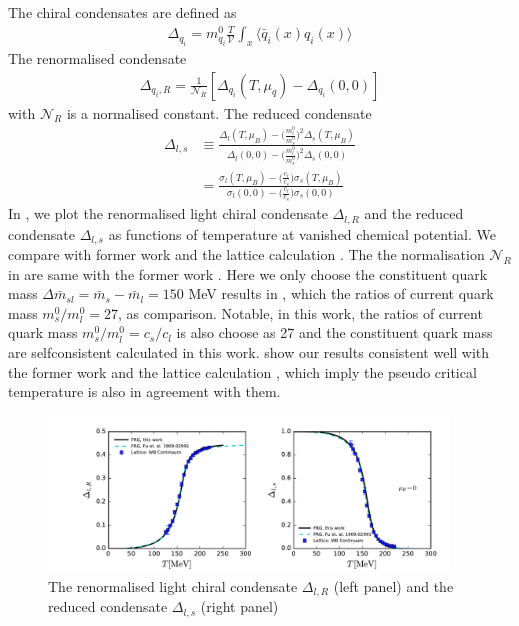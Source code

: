 \documentclass[%
reprint,
superscriptaddress,
showpacs,preprintnumbers,
amsmath,amssymb,
aps,
prd,
]{revtex4-1}
\def\fig#1{\Cref{#1}}
\def\Eq#1{\Cref{#1}}
\begin{document}
The chiral condensates are defined as
\begin{align}
\Delta_{q_i}=m_{q_i}^0\frac{T}{\mathcal{V}}\int_x\langle \bar q_i(x)q_i(x)\rangle
\end{align}
The renormalised condensate 
\begin{align}\label{eq:DeltaR}
\Delta_{q_i,R}=\frac{1}{\mathcal{N}_R}[\Delta_{q_i}(T,\mu_q)-\Delta_{q_i}(0,0)]
\end{align}
with $\mathcal{N}_R$ is a normalised constant.
The reduced condensate \cite{Herbst:2013ufa, Fu:2019hdw} 
\begin{align}\label{eq:Deltals}
\Delta_{l,s}&\equiv\frac{\Delta_{l}(T,\mu_B)-\Big( \frac{m_l^0}{m_s^0} \Big)^2 \Delta_s(T,\mu_B)}{\Delta_{l}(0,0)-\Big( \frac{m_l^0}{m_s^0} \Big)^2 \Delta_s(0,0)}\\
&=\frac{\sigma_{l}(T,\mu_B)-\big( \frac{c_l}{c_s} \big) \sigma_s(T,\mu_B)}{\sigma_{l}(0,0)-\big( \frac{c_l}{c_s} \big) \sigma_s(0,0)}
\end{align}
In \fig{fig:Delta}, we plot the renormalised light chiral condensate $\Delta_{l,R}$ and  the reduced condensate $\Delta_{l,s}$ as functions of temperature  at vanished chemical potential. We compare with former work \cite{Fu:2019hdw}  and the lattice calculation \cite{Borsanyi:2010bp}. The the normalisation $\mathcal{N}_R$ in \Eq{eq:DeltaR} are same with the former work \cite{Fu:2019hdw}. Here we only choose the constituent quark mass $\Delta \bar m _{sl}=\bar m_s-\bar m_l=150$ MeV results in \cite{Fu:2019hdw}, which the ratios of current quark mass $m_s^0/m_l^0=27$,   as comparison. Notable, in this work,  the ratios of current quark mass $m_s^0/m_l^0=c_s/c_l$ is also choose as 27 and the constituent quark mass are selfconsistent calculated in this work. \fig{fig:Delta} show our results consistent well with the former work \cite{Fu:2019hdw}  and the lattice calculation \cite{Borsanyi:2010bp}, which imply the pseudo critical temperature is also in agreement with them.

%
\begin{figure}[t]
\includegraphics[width=0.95\textwidth]{Delta}
\caption{The renormalised light chiral condensate $\Delta_{l,R}$ (left panel) and  the reduced condensate $\Delta_{l,s}$ (right panel) }\label{fig:Delta}
\end{figure}
%
\end{document}
